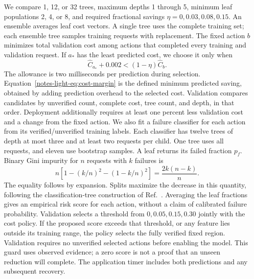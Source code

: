 \documentclass[11pt,a4paper]{article}
\begin{document}
We compare 1, 12, or 32 trees, maximum depths 1 through 5, minimum leaf populations 2, 4, or 8, and required fractional savings $\eta=0,0.03,0.08,0.15$. An ensemble averages leaf cost vectors. A single tree uses the complete training set; each ensemble tree samples training requests with replacement. The fixed action $b$ minimizes total validation cost among actions that completed every training and validation request. If $a_*$ has the least predicted cost, we choose it only when
\begin{equation}
 \widehat C_{a_*}+0.002 < (1-\eta)\widehat C_b.
 \label{notes-light-eq:cost-margin}
\end{equation}
The allowance is two milliseconds per prediction during selection. Equation~\eqref{notes-light-eq:cost-margin} is the defined minimum predicted saving, obtained by adding prediction overhead to the selected cost. Validation compares candidates by unverified count, complete cost, tree count, and depth, in that order. Deployment additionally requires at least one percent less validation cost and a change from the fixed action. We also fit a failure classifier for each action from its verified/unverified training labels. Each classifier has twelve trees of depth at most three and at least two requests per child. One tree uses all requests, and eleven use bootstrap samples. A leaf returns its failed fraction $p_f$. Binary Gini impurity for $n$ requests with $k$ failures is
\begin{equation}
 n\left[1-(k/n)^2-(1-k/n)^2\right]=\frac{2k(n-k)}{n}.
 \label{notes-light-eq:failure-gini}
\end{equation}
The equality follows by expansion. Splits maximize the decrease in this quantity, following the classification-tree construction of Ref.~\cite{CART1984}. Averaging the leaf fractions gives an empirical risk score for each action, without a claim of calibrated failure probability. Validation selects a threshold from $0,0.05,0.15,0.30$ jointly with the cost policy. If the proposed score exceeds that threshold, or any feature lies outside its training range, the policy selects the fully verified fixed region. Validation requires no unverified selected actions before enabling the model. This guard uses observed evidence; a zero score is not a proof that an unseen reduction will complete. The application timer includes both predictions and any subsequent recovery.
\end{document}
